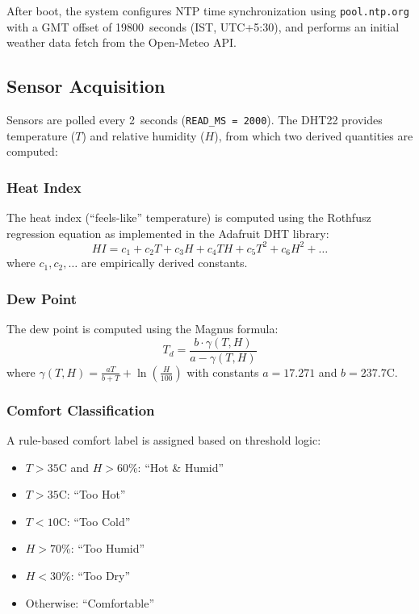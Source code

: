 \documentclass[conference]{IEEEtran}
\begin{document}
After boot, the system configures NTP time synchronization using \texttt{pool.ntp.org} with a GMT offset of 19800~seconds (IST, UTC+5:30), and performs an initial weather data fetch from the Open-Meteo API.

\subsection{Sensor Acquisition}

Sensors are polled every 2~seconds (\texttt{READ\_MS = 2000}). The DHT22 provides temperature ($T$) and relative humidity ($H$), from which two derived quantities are computed:

\subsubsection{Heat Index}
The heat index (``feels-like'' temperature) is computed using the Rothfusz regression equation as implemented in the Adafruit DHT library:
\begin{equation}
    HI = c_1 + c_2 T + c_3 H + c_4 TH + c_5 T^2 + c_6 H^2 + \ldots
\end{equation}
where $c_1, c_2, \ldots$ are empirically derived constants.

\subsubsection{Dew Point}
The dew point is computed using the Magnus formula:
\begin{equation}
    T_d = \frac{b \cdot \gamma(T, H)}{a - \gamma(T, H)}
    \label{eq:dewpoint}
\end{equation}
where $\gamma(T, H) = \frac{aT}{b + T} + \ln\left(\frac{H}{100}\right)$ with constants $a = 17.271$ and $b = 237.7$\textdegree C.

\subsubsection{Comfort Classification}
A rule-based comfort label is assigned based on threshold logic:
\begin{itemize}
    \item $T > 35$\textdegree C and $H > 60$\%: ``Hot \& Humid''
    \item $T > 35$\textdegree C: ``Too Hot''
    \item $T < 10$\textdegree C: ``Too Cold''
    \item $H > 70$\%: ``Too Humid''
    \item $H < 30$\%: ``Too Dry''
    \item Otherwise: ``Comfortable''
\end{itemize}
\end{document}
